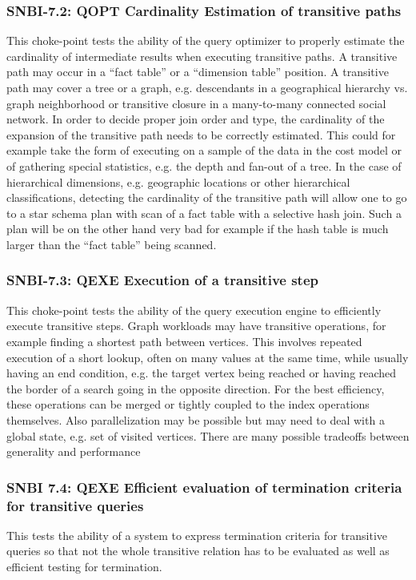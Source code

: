 \subsubsection{SNBI-7.2: QOPT Cardinality Estimation of transitive paths}
\label{choke_point_7.2}
This choke-point tests the ability of the query optimizer to properly estimate the cardinality of intermediate results when executing transitive paths. A transitive path may occur in a “fact table” or a “dimension table” position. 
A transitive path may cover a tree or a graph, e.g. descendants in a geographical hierarchy vs. graph neighborhood or transitive closure in a many-to-many connected social network. 
In order to decide proper join order and type, the cardinality of the expansion of the transitive path needs to be correctly estimated. 
This could for example take the form of executing on a sample of the data in the cost model or of gathering special statistics, e.g. the depth and fan-out of a tree. In the case of hierarchical dimensions, 
e.g. geographic locations or other hierarchical classifications, detecting the cardinality of the transitive path will allow one to go to a star schema plan with scan of a fact table with a selective hash join. 
Such a plan will be on the other hand very bad for example if the hash table is much larger than the “fact table” being scanned.

\subsubsection{SNBI-7.3: QEXE Execution of a transitive step}
\label{choke_point_7.3}
This choke-point tests the ability of the query execution engine to efficiently execute transitive steps. Graph workloads may have transitive operations, for example finding a shortest path between vertices. 
This involves repeated execution of a short lookup, often on many values at the same time, while usually having an end condition, e.g. the target vertex being reached or having reached the border of a search going in the opposite direction. 
For the best efficiency, these operations can be merged or tightly coupled to the index operations themselves. Also parallelization may be possible but may need to deal with a global state, e.g. set of visited vertices. 
There are many possible tradeoffs between generality and performance

\subsubsection{SNBI 7.4: QEXE Efficient evaluation of termination criteria for transitive queries}
\label{choke_point_7.4}
This tests the ability of a system to express termination criteria for transitive queries so that not the whole transitive relation has to be evaluated as well as efficient testing for termination.

